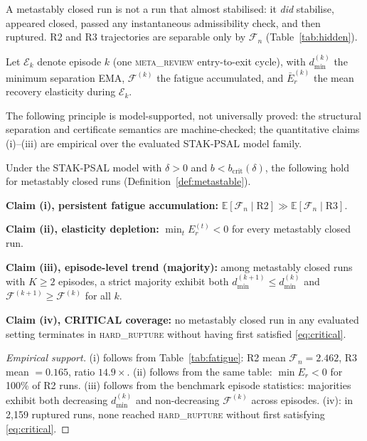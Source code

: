 \documentclass{llncs}
\newcommand{\st}[1]{\textup{\textsc{#1}}}
\begin{document}
A metastably closed run is not a run that almost stabilised: it
\emph{did} stabilise, appeared closed, passed any instantaneous
admissibility check, and then ruptured. R2 and R3 trajectories are
separable only by $\mathcal{F}_n$ (Table~\ref{tab:hidden}).

Let $\mathcal{E}_k$ denote episode $k$ (one \st{meta\_review}
entry-to-exit cycle), with $d_{\min}^{(k)}$ the minimum separation EMA,
$\mathcal{F}^{(k)}$ the fatigue accumulated, and $\bar{E}_r^{(k)}$ the
mean recovery elasticity during $\mathcal{E}_k$.

The following principle is model-supported, not universally proved:
the structural separation and certificate semantics are machine-checked;
the quantitative claims (i)--(iii) are empirical over the evaluated
STAK-PSAL model family.

\begin{principle}
\label{thm:mrp}
Under the STAK-PSAL model with $\delta > 0$ and $b <
b_{\mathrm{crit}}(\delta)$, the following hold for metastably closed
runs (Definition~\ref{def:metastable}).

\textbf{Claim (i), persistent fatigue accumulation:}
$\mathbb{E}[\mathcal{F}_n \mid \mathrm{R2}] \gg
\mathbb{E}[\mathcal{F}_n \mid \mathrm{R3}]$.

\textbf{Claim (ii), elasticity depletion:}
$\min_t E_r^{(t)} < 0$ for every metastably closed run.

\textbf{Claim (iii), episode-level trend (majority):} among metastably
closed runs with $K \geq 2$ episodes, a strict majority exhibit both
$d_{\min}^{(k+1)} \leq d_{\min}^{(k)}$ and $\mathcal{F}^{(k+1)} \geq
\mathcal{F}^{(k)}$ for all $k$.

\textbf{Claim (iv), CRITICAL coverage:} no metastably closed run in any
evaluated setting terminates in \st{hard\_rupture} without having first
satisfied \eqref{eq:critical}.
\end{principle}

\begin{proof}[Empirical support]
(i) follows from Table~\ref{tab:fatigue}: R2 mean $\mathcal{F}_n = 2.462$,
R3 mean $= 0.165$, ratio $14.9\times$. (ii) follows from the same table:
$\min E_r < 0$ for 100\% of R2 runs. (iii) follows from the benchmark episode statistics:
majorities exhibit both decreasing $d_{\min}^{(k)}$ and non-decreasing
$\mathcal{F}^{(k)}$ across episodes. (iv): in 2,159 ruptured runs, none
reached \st{hard\_rupture} without first satisfying \eqref{eq:critical}.
\end{proof}
\end{document}
